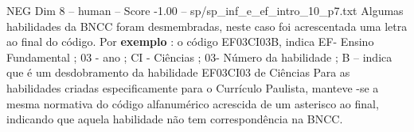 \begin{textsample}{NEG Dim 8 – human – Score -1.00 – sp/sp\_inf\_e\_ef\_intro\_10\_p7.txt}  \label{ex:f8_neg_014}
Algumas habilidades da BNCC foram desmembradas, neste caso foi acrescentada uma letra ao final do código.
Por \textbf{exemplo} : o código EF03CI03B, indica EF- Ensino Fundamental ; 03 - ano ; CI - Ciências ; 03- Número da habilidade ; B – indica que é um desdobramento da habilidade EF03CI03 de Ciências Para as habilidades criadas especificamente para o Currículo Paulista, manteve -se a mesma normativa do código alfanumérico acrescida de um asterisco ao final, indicando que aquela habilidade não tem correspondência na BNCC.

\end{textsample}
